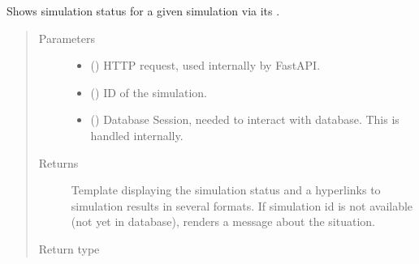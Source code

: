 \documentclass[a4paper,landscape,10pt,english]{sphinxmanual}
\begin{document}

\begin{fulllineitems}
\label{\detokenize{code_docs/simulation_api.controller:simulation_api.controller.main.simulate_status_sim_id}}
Shows simulation status for a given simulation via its .
\begin{quote}\begin{description}
\item[{Parameters}] \leavevmode\begin{itemize}
\item {} 
 () \textendash{} HTTP request, used internally by FastAPI.

\item {} 
 () \textendash{} ID of the simulation.

\item {} 
 () \textendash{} Database Session, needed to interact with database. This is handled
internally.

\end{itemize}

\item[{Returns}] \leavevmode
Template displaying the simulation status and a hyperlinks to
simulation results in several formats. If simulation id is not
available (not yet in database), renders a message about the situation.

\item[{Return type}] \leavevmode
{}

\end{description}\end{quote}

\end{fulllineitems}
\end{document}
